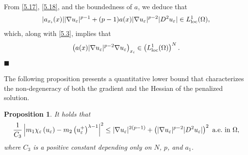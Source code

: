 \documentclass[onecolumn]{autart}
\newtheorem{proposition}{Proposition}
\newenvironment{proof}{{\it Proof: \enspace}}{\hfill $\blacksquare$\par}
\begin{document}
\begin{proof}
		{	From \eqref{5.17}, \eqref{5.18}, and the boundedness of $a $, } we deduce that
		\begin{align}
			|a_{x_i}(x)| |\nabla u_\varepsilon|^{p-1} + (p-1) a(x) |\nabla u_\varepsilon|^{p-2} |D^2 u_\varepsilon| \in L^1_{\mathrm{loc}}(\Omega),\notag
		\end{align}
		which, along with \eqref{5.3}, implies that
		\begin{align}
			\left( a(x) |\nabla u_\varepsilon|^{p-2} \nabla u_\varepsilon \right)_{x_i} \in \left( L^1_{\mathrm{loc}}(\Omega)\right) ^N.\notag
		\end{align}
	\end{proof}
	
	The following proposition presents a quantitative lower bound that characterizes the non-degeneracy of both the gradient and the Hessian of the penalized solution.
	\begin{proposition}\label{ho1}
		It holds that
		\begin{align}
			\frac{1}{C_3}\left| m_1 \chi_\varepsilon \left( u_\varepsilon \right) - m_2 \left(  u_{\varepsilon}^{+} \right) ^{\lambda-1}\right| ^2
			\leq |\nabla u_\varepsilon|^{2(p-1)}+\left(|\nabla u_\varepsilon|^{p-2} |D^2 u_\varepsilon|\right) ^2\ \text{a.e.\ in}\ \Omega,\notag
		\end{align}
		where  $C_3$  is a positive constant depending only on $N$, $p$,  and $a_1$.
	\end{proposition}
	
\end{document}
